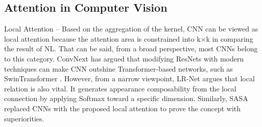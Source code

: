 \documentclass{article}
\begin{document}
\subsection{Attention in Computer Vision}
\label{sec2.3}
Local Attention – Based on the aggregation of the kernel, CNN can be viewed as local attention because the attention area is constrained into k×k in comparing the result of NL. That can be said, from a broad perspective, most CNNs belong to this category. ConvNext \cite{liu2022convnet} has argued that modifying ResNets with modern techniques can make CNN outshine Transformer-based networks, such as SwinTransformer \cite{liu2021swin}. However, from a narrow viewpoint, LR-Net \cite{hu2019local} argues that local relation is also vital. It generates appearance composability from the local connection by applying Softmax toward a specific dimension. Similarly, SASA \cite{ramachandran2019stand} replaced CNNs with the proposed local attention to prove the concept with superiorities. 
\end{document}
